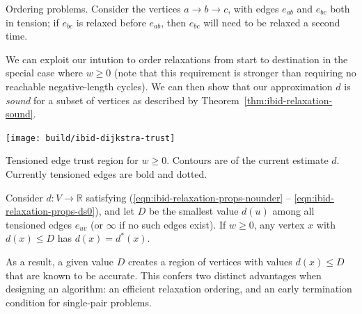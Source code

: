 \begin{marginfigure}
   \caption{Ordering problems.
      Consider the vertices $a \rightarrow b \rightarrow c$,
      with edges $e_{ab}$ and $e_{bc}$ both in tension;
      if $e_{bc}$ is relaxed before $e_{ab}$,
      then $e_{bc}$ will need to be relaxed a second time.}
   \label{fig:ibid:bellman-ford-repetitions}
\end{marginfigure}

We can exploit our intution to order relaxations from start to destination
in the special case where $w \geq 0$
(note that this requirement is stronger than requiring no reachable
negative-length cycles).
We can then show that our approximation $d$
is \emph{sound} for a subset of vertices
as described by Theorem~\ref{thm:ibid-relaxation-sound}.

\begin{marginfigure}
   \centering
   \texttt{[image: build/ibid-dijkstra-trust]}
   \caption{Tensioned edge trust region
      for $w \geq 0$.
      Contours are of the current estimate $d$.
      Currently tensioned edges are bold and dotted.}
\end{marginfigure}

\begin{theorem}
Consider $d: V \rightarrow \mathbb{R}$
satisfying (\ref{eqn:ibid-relaxation-props-nounder} --
\ref{eqn:ibid-relaxation-props-ds0}),
and let $D$ be the smallest value $d(u)$
among all tensioned edges $e_{uv}$
(or $\infty$ if no such edges exist).
If $w \geq 0$,
any vertex $x$ with $d(x) \leq D$
has $d(x) = d^*(x)$.
\label{thm:ibid-relaxation-sound}
\end{theorem}
As a result,
a given value $D$ creates a region of vertices
with values $d(x) \leq D$ that are known to be
accurate.
This confers two distinct advantages when designing an algorithm:
an efficient relaxation ordering,
and an early termination condition for single-pair problems.

